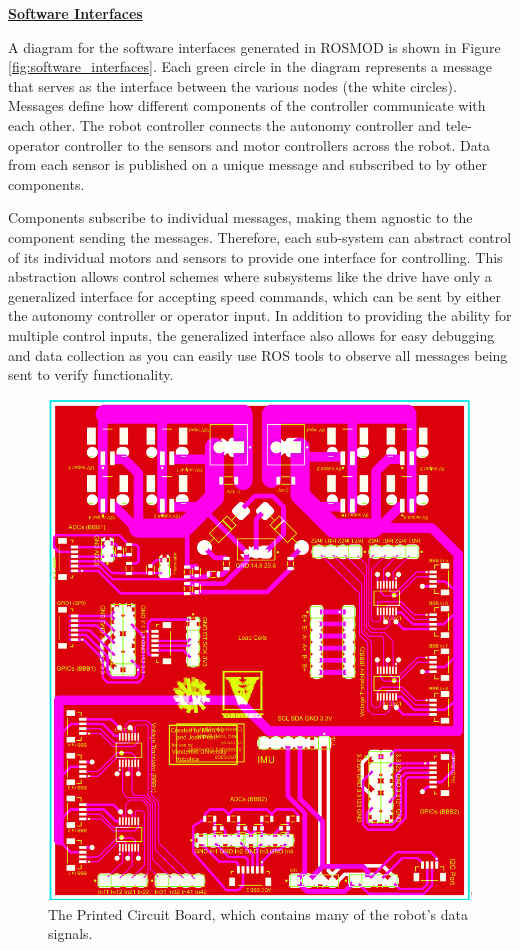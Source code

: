\documentclass[class=article, crop=false]{standalone}
\begin{document}
	\vspace*{0.1in}
	\noindent\textbf{\underline{Software Interfaces}}
	
	A diagram for the software interfaces generated in ROSMOD is shown in Figure \ref{fig:software_interfaces}. Each green circle in the diagram represents a message that serves as the interface between the various nodes (the white circles). Messages define how different components of the controller communicate with each other. The robot controller connects the autonomy controller and tele-operator controller to the sensors and motor controllers across the robot. Data from each sensor is published on a unique message and subscribed to by other components. 
	
	Components subscribe to individual messages, making them agnostic to the component sending the messages. Therefore, each sub-system can abstract control of its individual motors and sensors to provide one interface for controlling. This abstraction allows control schemes where subsystems like the drive have only a generalized interface for accepting speed commands, which can be sent by either the autonomy controller or operator input. In addition to providing the ability for multiple control inputs, the generalized interface also allows for easy debugging and data collection as you can easily use ROS tools to observe all messages being sent to verify functionality.
		
	\FloatBarrier
	\begin{figure}[h]
		\centering
		\includegraphics[width=0.6\linewidth]{09_Figures/pcb.jpg}
		\caption{The Printed Circuit Board, which contains many of the robot's data signals.}
		\label{fig:pcb}
	\end{figure}
	\FloatBarrier
	
	
\end{document}

